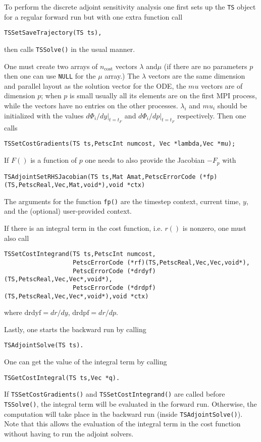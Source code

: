 {To perform the discrete adjoint sensitivity analysis one first sets up the \lstinline{TS} object for a regular forward run but with one extra function call
\begin{lstlisting}
TSSetSaveTrajectory(TS ts),
\end{lstlisting}
then calls \lstinline{TSSolve()} in the usual manner.

One must create two arrays of $n_\text{cost}$ vectors $\lambda$ and$\mu$ (if there are no parameters $p$ then one can use \lstinline{NULL} for the $\mu$ array.) The $\lambda$ vectors are the same dimension and parallel layout as the solution vector for the ODE, the $mu$ vectors are of dimension $p$; when $p$ is small usually all its elements are on the first MPI process, while the vectors have no entries on the other processes. $\lambda_i$ and $mu_i$ should be initialized with the values $d\Phi_i/dy|_{t=t_F}$ and $d\Phi_i/dp|_{t=t_F}$ respectively. Then one calls
\begin{lstlisting}
TSSetCostGradients(TS ts,PetscInt numcost, Vec *lambda,Vec *mu);
\end{lstlisting}

If $F()$ is a function of $p$ one needs to also provide the Jacobian $-F_p$ with
\begin{lstlisting}
TSAdjointSetRHSJacobian(TS ts,Mat Amat,PetscErrorCode (*fp)(TS,PetscReal,Vec,Mat,void*),void *ctx)
\end{lstlisting}
The arguments for the function \lstinline{fp()}
are the timestep context, current time, $y$, and the (optional) user-provided context.

If there is an integral term in the cost function, i.e. $r()$ is nonzero, one must also call
\begin{lstlisting}
TSSetCostIntegrand(TS ts,PetscInt numcost,
                   PetscErrorCode (*rf)(TS,PetscReal,Vec,Vec,void*),
                   PetscErrorCode (*drdyf)(TS,PetscReal,Vec,Vec*,void*),
                   PetscErrorCode (*drdpf)(TS,PetscReal,Vec,Vec*,void*),void *ctx)
\end{lstlisting}
where $\mathrm{drdyf}= dr /dy$, $\mathrm{drdpf} = dr /dp$.

Lastly, one starts the backward run by calling
\begin{lstlisting}
TSAdjointSolve(TS ts).
\end{lstlisting}

One can get the value of the integral term by calling
\begin{lstlisting}
TSGetCostIntegral(TS ts,Vec *q).
\end{lstlisting}
If \lstinline{TSSetCostGradients()} and \lstinline{TSSetCostIntegrand()} are called before \lstinline{TSSolve()}, the integral term will be evaluated in the forward run.
Otherwise, the computation will take place in the backward run (inside \lstinline{TSAdjointSolve()}).
Note that this allows the evaluation of the integral term in the cost function without having to run the adjoint solvers.

}
